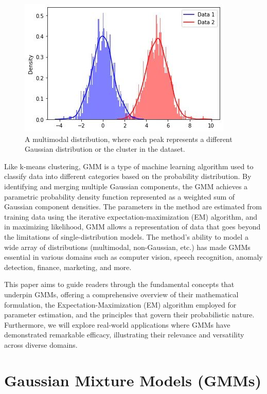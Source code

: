 \documentclass[12pt]{article}
\begin{document}
\begin{figure}
\centering
\includegraphics{3.jpg}
\caption{A multimodal distribution, where each peak represents a
different Gaussian distribution or the cluster in the dataset.}
\end{figure}

Like k-means clustering, GMM is a type of machine learning algorithm
used to classify data into different categories based on the probability
distribution. By identifying and merging multiple Gaussian components,
the GMM achieves a parametric probability density function represented
as a weighted sum of Gaussian component densities. The parameters in the
method are estimated from training data using the iterative
expectation-maximization (EM) algorithm, and in maximizing likelihood,
GMM allows a representation of data that goes beyond the limitations of
single-distribution models. The method's ability to model a wide array
of distributions (multimodal, non-Gaussian, etc.) has made GMMs
essential in various domains such as computer vision, speech
recognition, anomaly detection, finance, marketing, and more.

This paper aims to guide readers through the fundamental concepts that
underpin GMMs, offering a comprehensive overview of their mathematical
formulation, the Expectation-Maximization (EM) algorithm employed for
parameter estimation, and the principles that govern their probabilistic
nature. Furthermore, we will explore real-world applications where GMMs
have demonstrated remarkable efficacy, illustrating their relevance and
versatility across diverse domains.

\hypertarget{gaussian-mixture-models-gmms}{%
\section{Gaussian Mixture Models
(GMMs)}\label{gaussian-mixture-models-gmms}}
\end{document}
